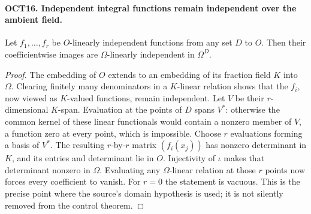 \paragraph{OCT16. Independent integral functions remain independent over the ambient field.}
\label{claim:OCT16}
Let $f_1,\ldots,f_r$ be $O$-linearly independent functions
from any set $D$ to $O$.  Then their coefficientwise images
are $\Omega$-linearly independent in $\Omega^D$.
\begin{proof}
The embedding of $O$ extends to an embedding of its fraction
field $K$ into $\Omega$.  Clearing finitely many denominators
in a $K$-linear relation shows that the $f_i$, now viewed as
$K$-valued functions, remain independent.  Let $V$ be their
$r$-dimensional $K$-span.  Evaluation at the points of $D$
spans $V^*$: otherwise the common kernel of these linear
functionals would contain a nonzero member of $V$, a
function zero at every point, which is impossible.  Choose
$r$ evaluations forming a basis of $V^*$.  The resulting
$r$-by-$r$ matrix $(f_i(x_j))$ has nonzero determinant in
$K$, and its entries and determinant lie in $O$.
Injectivity of $\iota$ makes that determinant nonzero in
$\Omega$.  Evaluating any $\Omega$-linear relation at those
$r$ points now forces every coefficient to vanish.  For
$r=0$ the statement is vacuous.  This is the precise point
where the source's domain hypothesis is used; it is not
silently removed from the control theorem.
\end{proof}


